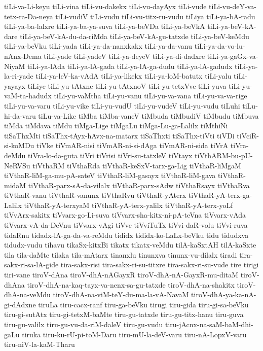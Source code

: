{tiLi-va-Li-keyu
tiLi-vina
tiLi-vu-dakekx
tiLi-vu-dayAyx
tiLi-vude
tiLi-vu-deY-va-tetx-ra-Da-neya
tiLi-vudiV
tiLi-vudu
tiLi-vu-titx-ru-vudu
tiLiya
tiLi-ya-bA-radu
tiLi-ya-ba-lalxre
tiLi-ya-ba-ya-suva
tiLi-ya-beVDa
tiLi-ya-beVkA
tiLi-ya-beV-kA-dare
tiLi-ya-beV-kA-du-da-riMda
tiLi-ya-beV-kA-gu-tatxde
tiLi-ya-beV-keMdu
tiLi-ya-beVku
tiLi-yada
tiLi-ya-da-nanxkakx
tiLi-ya-da-vanu
tiLi-ya-da-vo-lu-nAnx-Dema
tiLi-yade
tiLi-yadeV
tiLi-ya-deyeV
tiLi-ya-di-dadxre
tiLi-ya-gaGx-va-NiyaM
tiLi-ya-lAda
tiLi-ya-lA-gada
tiLi-ya-lA-ga-dudu
tiLi-ya-lA-gadudx
tiLi-ya-la-ri-yade
tiLi-ya-leV-ka-vAdA
tiLi-ya-likekx
tiLi-ya-loM-batutx
tiLi-yalu
tiLi-yayayx
tiLiye
tiLi-yu-tAtxne
tiLi-yu-tAtxnoV
tiLi-yu-tetxVve
tiLi-yuva
tiLi-yu-vaM-ta-hadudx
tiLi-yu-vaMtha
tiLi-yu-vanu
tiLi-yu-va-vana
tiLi-yu-va-va-rige
tiLi-yu-va-varu
tiLi-yu-vike
tiLi-yu-vudU
tiLi-yu-vudeV
tiLi-yu-vudu
tiLuhi
tiLu-hi-da-varu
tiLu-va-Like
tiMba
tiMba-vaneV
tiMbuda
tiMbudiV
tiMbudu
tiMbuva
tiMda
tiMdava
tiMdu
tiMga-Lige
tiMgaLu
tiMga-Lu-ga-Lalilx
tiMthiNi
tiSaThxMti
tiSaThx-tAyx-hAvx-na-matarx
tiSaThxti
tiSaThx-tiVti
tiVDi
tiVciR-si-koMDu
tiVke
tiVmAR-nisi
tiVmAR-ni-si-dAga
tiVmAR-ni-sida
tiVrA
tiVra-deMdu
tiVra-lo-da-guta
tiVri
tiVrisi
tiVri-su-tatxleV
tiVtayx
tiVthARM-bu-pU-NeRVSu
tiVthaRM
tiVthaRda
tiVthaR-keSxV-tarx-ga-Lig
tiVthaR-liMgaM
tiVthaR-liM-ga-mu-pA-sateV
tiVthaR-liM-gasayx
tiVthaR-liM-gava
tiVthaR-midaM
tiVthaR-parx-sA-da-vilalx
tiVthaR-parx-sAdw
tiVthaRsayx
tiVthaRva
tiVthaR-vanu
tiVthaR-vanunx
tiVthaRvu
tiVthaR-yAterx
tiVthaR-yA-terx-ga-Lalilx
tiVthaR-yA-terxyaM
tiVthaR-yA-terx-yalilx
tiVthaR-yA-terx-yoLf
tiVvArx-sakitx
tiVvarx-go-Li-suva
tiVvarx-sha-kitx-ni-pA-teVna
tiVvarx-vAda
tiVvarx-vA-da-DeVnu
tiVvarx-vAgi
tiVve
tiVviTuTx
tiVvi-daR-volu
tiVvi-ruva
tidaRnu
tidadx-lA-ga-da-va-reMdu
tididx
tididx-ko-LaLx-beVku
tidu
tidudxva
tidudx-vudu
tihavu
tikaSx-kitxBi
tikatx
tikatx-veMdu
tilA-kaSxtAH
tilA-kaSxte
tila
tila-daMte
tilaka
tila-mAtarx
tinanxlu
tinunxva
tinunx-vu-dilalx
tiradi
tira-sakx-ri-sa-lA-gide
tira-sakx-risi
tira-sakx-ri-su-titxre
tira-sakx-ri-su-vude
tire
tirigi
tiri-vane
tiroV-dAna
tiroV-dhA-nAGayxR
tiroV-dhA-nA-GayxR-mu-ditaM
tiroV-dhAna
tiroV-dhA-na-kaq-tayx-va-nenx-sa-gu-tatxde
tiroV-dhA-na-shakitx
tiroV-dhA-na-veMdu
tiroV-dhA-na-viM-teY-du-ma-la-vA-NavaM
tiroV-dhA-ya-ka-nA-gi-dAdxne
tiruLa
tiru-cacx-ranf
tiru-ga-beVku
tirugi
tiru-gida
tiru-gi-sa-beVku
tiru-gi-sutAtx
tiru-gi-tetxM-baMte
tiru-gu-tatxde
tiru-gu-titx-hanu
tiru-guva
tiru-gu-valilx
tiru-gu-vu-da-riM-daleV
tiru-gu-vudu
tiru-jAcnx-na-saM-baM-dhi-gaLu
tiruka
tiru-ku-rU-pi-toM-Daru
tiru-mU-la-deV-varu
tiru-nA-LopxV-varu
tiru-niV-la-kaM-Tharu
}
